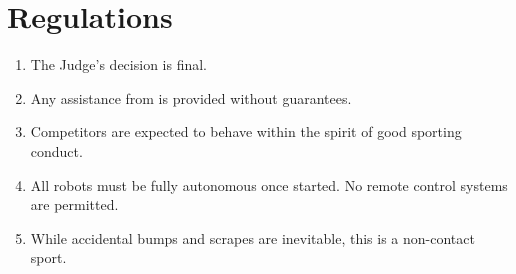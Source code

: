 \section{Regulations}
\label{sec:regs}

\begin{enumerate}
\item The Judge's decision is final.
\item Any assistance from \staff is provided without guarantees.
\item Competitors are expected to behave within the spirit of good
      sporting conduct.
\item All robots must be fully autonomous once started. No remote control
      systems are permitted.
\item While accidental bumps and scrapes are inevitable, this is a
      non-contact sport.
\end{enumerate}
